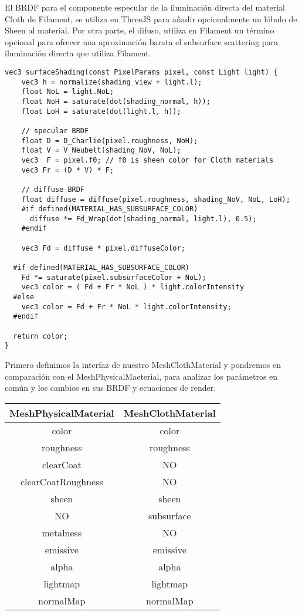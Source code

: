 El BRDF para el componente especular de la iluminaci\'on directa del material Cloth de Filament,
se utiliza en ThreeJS para a\~nadir opcionalmente un l\'obulo de Sheen al material. Por otra
parte, el difuso, utiliza en Filament un t\'ermino opcional para ofrecer una aproximaci\'on
barata el subsurface scattering para iluminaci\'on directa que utiliza Filament.\newline

\begin{lstlisting}[caption=Implementaci\'on del BRDF de iluminaci\'on directa de Filament]
  vec3 surfaceShading(const PixelParams pixel, const Light light) {
    vec3 h = normalize(shading_view + light.l);
    float NoL = light.NoL;
    float NoH = saturate(dot(shading_normal, h));
    float LoH = saturate(dot(light.l, h));

    // specular BRDF
    float D = D_Charlie(pixel.roughness, NoH);
    float V = V_Neubelt(shading_NoV, NoL);
    vec3  F = pixel.f0; // f0 is sheen color for Cloth materials 
    vec3 Fr = (D * V) * F;

    // diffuse BRDF
    float diffuse = diffuse(pixel.roughness, shading_NoV, NoL, LoH);
    #if defined(MATERIAL_HAS_SUBSURFACE_COLOR)
      diffuse *= Fd_Wrap(dot(shading_normal, light.l), 0.5);
    #endif

    vec3 Fd = diffuse * pixel.diffuseColor;

  #if defined(MATERIAL_HAS_SUBSURFACE_COLOR)
    Fd *= saturate(pixel.subsurfaceColor + NoL);
    vec3 color = ( Fd + Fr * NoL ) * light.colorIntensity
  #else
    vec3 color = Fd + Fr * NoL * light.colorIntensity;
  #endif

  return color;
}
\end{lstlisting}

Primero definimos la interfaz de nuestro MeshClothMaterial y pondremos en comparaci\'on con
el MeshPhysicalMaeterial, para analizar los par\'ametros en com\'un y los cambios en sus BRDF
y ecuaciones de render.\newline

\centering
\begin{tabular}{| c | c |}
  \hline
  MeshPhysicalMaterial & MeshClothMaterial \\ \hline
  color & color \\
  roughness & roughness \\
  clearCoat & NO \\
  clearCoatRoughness & NO \\
  sheen  & sheen  \\
  NO  & subsurface  \\
  metalness & NO \\
  emissive & emissive \\
  alpha & alpha \\
  lightmap & lightmap \\
  normalMap & normalMap \\ \hline
\end{tabular}

